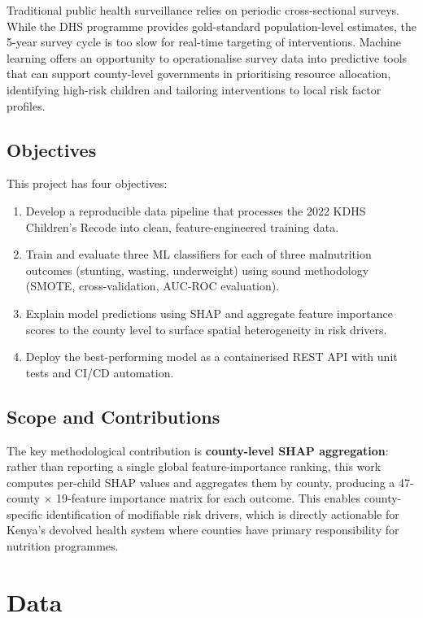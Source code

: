 \documentclass[12pt, a4paper]{article}
\begin{document}
Traditional public health surveillance relies on periodic cross-sectional
surveys. While the DHS programme provides gold-standard population-level
estimates, the 5-year survey cycle is too slow for real-time targeting of
interventions. Machine learning offers an opportunity to operationalise
survey data into predictive tools that can support county-level governments
in prioritising resource allocation, identifying high-risk children and
tailoring interventions to local risk factor profiles.

\subsection{Objectives}
This project has four objectives:
\begin{enumerate}[noitemsep]
    \item Develop a reproducible data pipeline that processes the 2022 KDHS
          Children's Recode into clean, feature-engineered training data.
    \item Train and evaluate three ML classifiers for each of three
          malnutrition outcomes (stunting, wasting, underweight) using
          sound methodology (SMOTE, cross-validation, AUC-ROC evaluation).
    \item Explain model predictions using SHAP and aggregate feature
          importance scores to the county level to surface spatial
          heterogeneity in risk drivers.
    \item Deploy the best-performing model as a containerised REST API
          with unit tests and CI/CD automation.
\end{enumerate}

\subsection{Scope and Contributions}
The key methodological contribution is \textbf{county-level SHAP
aggregation}: rather than reporting a single global feature-importance
ranking, this work computes per-child SHAP values and aggregates them by
county, producing a 47-county $\times$ 19-feature importance matrix for
each outcome. This enables county-specific identification of modifiable
risk drivers, which is directly actionable for Kenya's devolved health
system where counties have primary responsibility for nutrition programmes.

\section{Data}
\label{sec:data}
\end{document}
